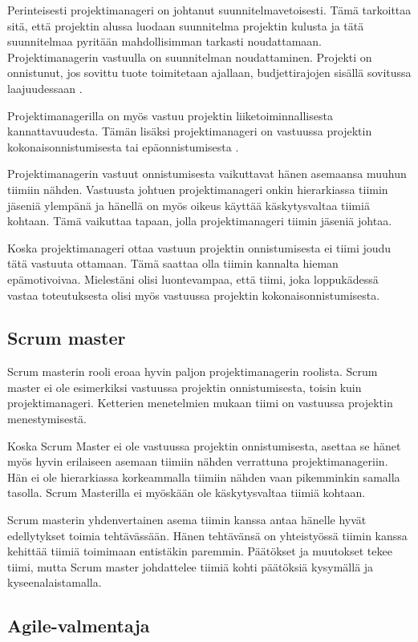 \documentclass[a4paper]{article}
\begin{document}
Perinteisesti projektimanageri on johtanut suunnitelmavetoisesti. Tämä tarkoittaa sitä, että projektin alussa luodaan suunnitelma projektin kulusta ja tätä suunnitelmaa pyritään mahdollisimman tarkasti noudattamaan. Projektimanagerin vastuulla on suunnitelman noudattaminen. Projekti on onnistunut, jos sovittu tuote toimitetaan ajallaan, budjettirajojen sisällä sovitussa laajuudessaan \citep{adkins2010}.

Projektimanagerilla on myös vastuu projektin liiketoiminnallisesta kannattavuudesta. Tämän lisäksi projektimanageri on vastuussa projektin kokonaisonnistumisesta tai epäonnistumisesta \citep{augustine2005}.

Projektimanagerin vastuut onnistumisesta vaikuttavat hänen asemaansa muuhun tiimiin nähden. Vastuusta johtuen projektimanageri onkin hierarkiassa tiimin jäseniä ylempänä ja hänellä on myös oikeus käyttää käskytysvaltaa tiimiä kohtaan. Tämä vaikuttaa tapaan, jolla projektimanageri tiimin jäseniä johtaa.

Koska projektimanageri ottaa vastuun projektin onnistumisesta ei tiimi joudu tätä vastuuta ottamaan. Tämä saattaa olla tiimin kannalta hieman epämotivoivaa. Mielestäni olisi luontevampaa, että tiimi, joka loppukädessä vastaa toteutuksesta olisi myös vastuussa projektin kokonaisonnistumisesta.

\subsection{Scrum master}

Scrum masterin rooli eroaa hyvin paljon projektimanagerin roolista. Scrum master ei ole esimerkiksi vastuussa projektin onnistumisesta, toisin kuin projektimanageri. Ketterien menetelmien mukaan tiimi on vastuussa projektin menestymisestä.

Koska Scrum Master ei ole vastuussa projektin onnistumisesta, asettaa se hänet myös hyvin erilaiseen asemaan tiimiin nähden verrattuna projektimanageriin. Hän ei ole hierarkiassa korkeammalla tiimiin nähden vaan pikemminkin samalla tasolla. Scrum Masterilla ei myöskään ole käskytysvaltaa tiimiä kohtaan.

Scrum masterin yhdenvertainen asema tiimin kanssa antaa hänelle hyvät edellytykset toimia tehtävässään. Hänen tehtävänsä on yhteistyössä tiimin kanssa kehittää tiimiä toimimaan entistäkin paremmin. Päätökset ja muutokset tekee tiimi, mutta Scrum master johdattelee tiimiä kohti päätöksiä kysymällä ja kyseenalaistamalla.

\subsection{Agile-valmentaja}
\end{document}
